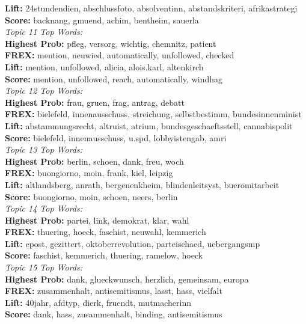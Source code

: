  	 \textbf{Lift:} 24stundendien, abschlussfoto, absolventinn, abstandskriteri, afrikastrategi \\
 	 \textbf{Score:} backnang, gmuend, achim, bentheim, sauerla \\
\textit{Topic 11 Top Words:}\\
 	 \textbf{Highest Prob:} pfleg, versorg, wichtig, chemnitz, patient \\
 	 \textbf{FREX:} mention, neuwied, automatically, unfollowed, checked \\
 	 \textbf{Lift:} mention, unfollowed, alicia, alois.karl, altenkirch \\
 	 \textbf{Score:} mention, unfollowed, reach, automatically, windhag \\
\textit{Topic 12 Top Words:}\\
 	 \textbf{Highest Prob:} frau, gruen, frag, antrag, debatt \\
 	 \textbf{FREX:} bielefeld, innenausschuss, streichung, selbstbestimm, bundesinnenminist \\
 	 \textbf{Lift:} abstammungsrecht, altruist, atrium, bundesgeschaeftsstell, cannabispolit \\
 	 \textbf{Score:} bielefeld, innenausschuss, u.spd, lobbyistengab, amri \\
\textit{Topic 13 Top Words:}\\
 	 \textbf{Highest Prob:} berlin, schoen, dank, freu, woch \\
 	 \textbf{FREX:} buongiorno, moin, frank, kiel, leipzig \\
 	 \textbf{Lift:} altlandsberg, anrath, bergenenkheim, blindenleitsyst, bueromitarbeit \\
 	 \textbf{Score:} buongiorno, moin, schoen, neers, berlin \\
\textit{Topic 14 Top Words:}\\
 	 \textbf{Highest Prob:} partei, link, demokrat, klar, wahl \\
 	 \textbf{FREX:} thuering, hoeck, faschist, neuwahl, kemmerich \\
 	 \textbf{Lift:} epost, gezittert, oktoberrevolution, parteischaed, uebergangsmp \\
 	 \textbf{Score:} faschist, kemmerich, thuering, ramelow, hoeck \\
\textit{Topic 15 Top Words:}\\
 	 \textbf{Highest Prob:} dank, glueckwunsch, herzlich, gemeinsam, europa \\
 	 \textbf{FREX:} zusammenhalt, antisemitismus, lasst, hass, vielfalt \\
 	 \textbf{Lift:} 40jahr, afdtyp, dierk, fruendt, mutmacherinn \\
 	 \textbf{Score:} dank, hass, zusammenhalt, binding, antisemitismus \\

